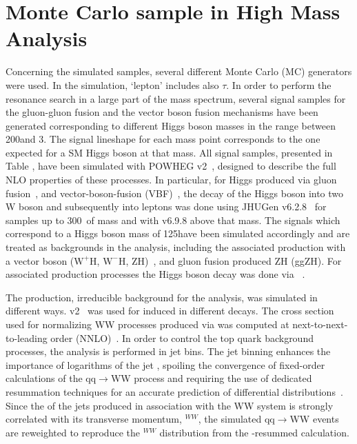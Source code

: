 \section{Monte Carlo sample in High Mass Analysis}

Concerning the simulated samples, several different Monte Carlo (MC) generators were used. 
In the simulation, `lepton' includes also $\tau$.
In order to perform the resonance search in a large part of the mass spectrum,
several signal samples for the gluon-gluon fusion and the vector boson fusion
mechanisms have been generated corresponding to different Higgs boson masses
in the range between 200\GeV and 3\TeV. The signal lineshape for each mass point corresponds to the one expected for a SM Higgs boson at that mass.
All signal samples, presented in Table , have been simulated with
POWHEG v2~\cite{Nason:2004rx,Frixione:2007vw,Alioli:2010xd}, designed to describe the full NLO properties of these processes.
In particular, for Higgs produced via gluon fusion~\cite{Alioli:2008tz}, and vector-boson-fusion (VBF)~\cite{Nason:2009ai},
the decay of the Higgs boson into two W boson and subsequently into leptons
was done using JHUGen v6.2.8~\cite{jhugen} for samples up to 300~\GeV of mass
and with v6.9.8 above that mass.
The signals which correspond to a Higgs boson mass of 125\GeV have been simulated accordingly and are treated as backgrounds in the analysis, including the associated production with a vector boson ($\mathrm{W^{+}H}$, $\mathrm{W^{-}H}$, ZH)~\cite{Luisoni:2013kna}, and gluon fusion produced ZH (ggZH). For associated production processes the Higgs boson decay was done via ~\cite{Sjostrand:2007gs}.



The \WW production, irreducible background for the analysis, was simulated in different ways. 
\POWHEG v2~\cite{Melia:2011tj} was used for \qqbar induced \WW in different decays. 
The cross section used for normalizing WW processes produced via \qqbar was computed at next-to-next-to-leading order (NNLO)~\cite{Gehrmann:2014fva}. 
In order to control the top quark background processes, the analysis is
performed in jet bins. The jet binning enhances the importance of logarithms of the jet \pt, spoiling the convergence of 
fixed-order calculations of the qq$\rightarrow$WW process and requiring the use of dedicated resummation techniques for an
accurate prediction of differential
distributions~\cite{Meade:2014fca,Jaiswal:2014yba}.  
Since the \pt of the jets produced in association with the WW system is strongly correlated with its transverse momentum, 
\pt$^{WW}$,  the simulated qq$\rightarrow$WW events are reweighted  
to reproduce the \pt$^{WW}$ distribution from the \pt-resummed calculation.

